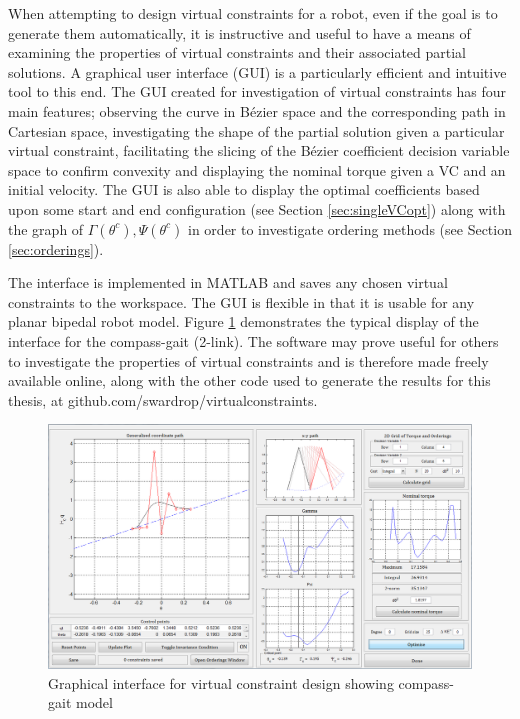 When attempting to design virtual constraints for a robot, even if the goal is to generate them automatically, it is instructive and useful to have a means of examining the properties of virtual constraints and their associated partial solutions. A graphical user interface (GUI) is a particularly efficient and intuitive tool to this end. The GUI created for investigation of virtual constraints has four main features; observing the curve in Bézier space and the corresponding path in Cartesian space, investigating the shape of the partial solution given a particular virtual constraint, facilitating the slicing of the Bézier coefficient decision variable space to confirm convexity and displaying the nominal torque given a VC and an initial velocity. The GUI is also able to display the optimal coefficients based upon some start and end configuration (see Section \ref{sec:singleVCopt}) along with the graph of $\Gamma(\theta^c), \Psi(\theta^c)$ in order to investigate ordering methods (see Section \ref{sec:orderings}).

The interface is implemented in MATLAB and saves any chosen virtual constraints to the workspace. The GUI is flexible in that it is usable for any planar bipedal robot model. Figure \ref{fig:guiCG} demonstrates the typical display of the interface for the compass-gait (2-link). The software may prove useful for others to investigate the properties of virtual constraints and is therefore made freely available online, along with the other code used to generate the results for this thesis, at github.com/swardrop/virtualconstraints.

\begin{figure}
	\centering
	\includegraphics[width=0.9\linewidth]{4VirtConstLib/guiVC.png}
	\caption{Graphical interface for virtual constraint design showing compass-gait model}
	\label{fig:guiCG}
\end{figure}